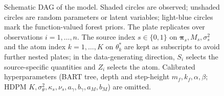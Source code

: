 \begin{figure}[tb]
\caption{Schematic DAG of the model. Shaded circles are observed; unshaded circles are random parameters or latent variables; light-blue circles mark the function-valued forest priors. The plate replicates over observations $i = 1, \ldots, n$. The source index $s \in \{0, 1\}$ on $\bm{\pi}_s, M_s, \sigma_s^2$ and the atom index $k = 1, \ldots, K$ on $\theta_k^*$ are kept as subscripts to avoid further nested plates; in the data-generating direction, $S_i$ selects the source-specific quantities and $Z_i$ selects the atom. Calibrated hyperparameters (BART tree, depth and step-height $m_f, k_f, \alpha, \beta$; HDPM $K, \sigma_\theta^2, \kappa_s, \nu_s, a_\gamma, b_\gamma, a_M, b_M$) are omitted.}
\label{fig:dag}
\end{figure}
